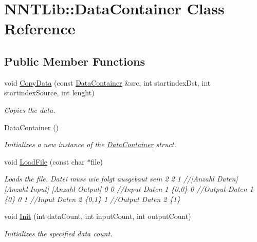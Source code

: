 \hypertarget{class_n_n_t_lib_1_1_data_container}{}\section{N\+N\+T\+Lib\+:\+:Data\+Container Class Reference}
\label{class_n_n_t_lib_1_1_data_container}
\subsection*{Public Member Functions}
\begin{DoxyCompactItemize}
\item 
void \hyperlink{class_n_n_t_lib_1_1_data_container_afad4bfed596006fe669600d6922d21be}{Copy\+Data} (const \hyperlink{class_n_n_t_lib_1_1_data_container}{Data\+Container} \&src, int startindex\+Dst, int startindex\+Source, int lenght)
\begin{DoxyCompactList}\small\item\em Copies the data. \end{DoxyCompactList}\item 
\hyperlink{class_n_n_t_lib_1_1_data_container_a3e3a40faa67e7695f3ccc9e564c9ff40}{Data\+Container} ()
\begin{DoxyCompactList}\small\item\em Initializes a new instance of the \hyperlink{class_n_n_t_lib_1_1_data_container}{Data\+Container} struct. \end{DoxyCompactList}\item 
void \hyperlink{class_n_n_t_lib_1_1_data_container_ae025ff11546a36319b21f700095a1a97}{Load\+File} (const char $\ast$file)
\begin{DoxyCompactList}\small\item\em Loads the file. Datei muss wie folgt ausgebaut sein 2 2 1 //\mbox{[}Anzahl Daten\mbox{]} \mbox{[}Anzahl Input\mbox{]} \mbox{[}Anzahl Output\mbox{]} 0 0 //\+Input Daten 1 \{0,0\} 0 //\+Output Daten 1 \{0\} 0 1 //\+Input Daten 2 \{0,1\} 1 //\+Output Daten 2 \{1\} \end{DoxyCompactList}\item 
void \hyperlink{class_n_n_t_lib_1_1_data_container_a6f3a9e67619494c00732f6f8a5188246}{Init} (int data\+Count, int input\+Count, int output\+Count)
\begin{DoxyCompactList}\small\item\em Initializes the specified data count. \end{DoxyCompactList}\item 

\end{DoxyCompactItemize}
